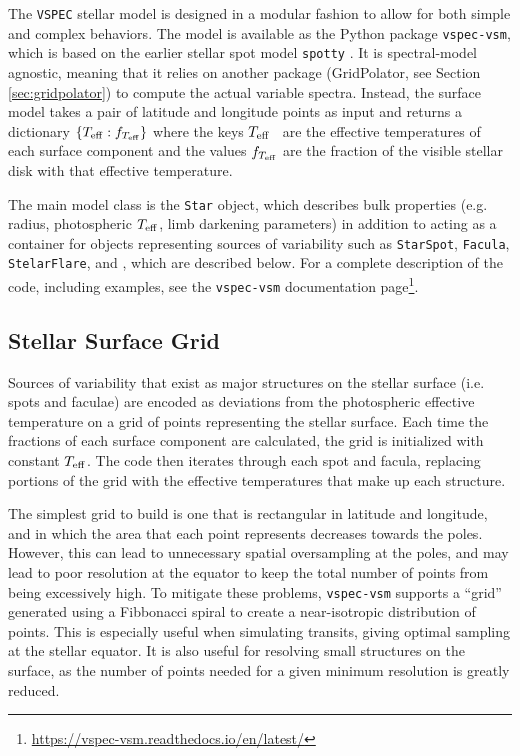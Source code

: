 \documentclass[linenumbers,preprint,authoryear]{elsarticle}
\newcommand{\teff}{$T_{\rm eff}$}
\newcommand{\vspec}[1]{\texttt{VSPEC}#1}
\newcommand{\urldocsvspecvsm}{\url{https://vspec-vsm.readthedocs.io/en/latest/}}
\begin{document}
The \vspec{} stellar model is designed in a modular fashion to allow for both simple and complex behaviors. The model is available as the Python package \texttt{vspec-vsm}, which is based on the earlier stellar spot model \texttt{spotty} \citep{barclay2021}. It is spectral-model agnostic, meaning that it relies on another package (GridPolator, see Section \ref{sec:gridpolator}) to compute the actual variable spectra. Instead, the surface model takes a pair of latitude and longitude points as input and returns a dictionary $\{ T_{\rm eff} : f_{T_{\rm eff}} \}$ where the keys \teff~ are the effective temperatures of each surface component and the values $f_{T_{\rm eff}}$ are the fraction of the visible stellar disk with that effective temperature.

The main model class is the \texttt{Star} object, which describes bulk properties (e.g. radius, photospheric \teff, limb darkening parameters) in addition to acting as 
a container for objects representing sources of variability such as \texttt{StarSpot}, \texttt{Facula}, \texttt{StelarFlare}, and , which are described below. For a complete description of the code, including examples, see the \texttt{vspec-vsm} documentation page\footnote{\urldocsvspecvsm}.

\subsection{Stellar Surface Grid}
Sources of variability that exist as major structures on the stellar surface (i.e. spots and faculae) are encoded as deviations from the photospheric effective temperature on a grid of points representing the stellar surface. Each time the fractions of each surface component are calculated, the grid is initialized with constant \teff. The code then iterates through each spot and facula, replacing portions of the grid with the effective temperatures that make up each structure.

The simplest grid to build is one that is rectangular in latitude and longitude, and in which the area that each point represents decreases towards the poles. However, this can lead to unnecessary spatial oversampling at the poles, and may lead to poor resolution at the equator to keep the total number of points from being excessively high. To mitigate these problems, \texttt{vspec-vsm} supports a ``grid'' generated using a Fibbonacci spiral to create a near-isotropic distribution of points. This is especially useful when simulating transits, giving optimal sampling at the stellar equator. It is also useful for resolving small structures on the surface, as the number of points needed for a given minimum resolution is greatly reduced.
\end{document}
